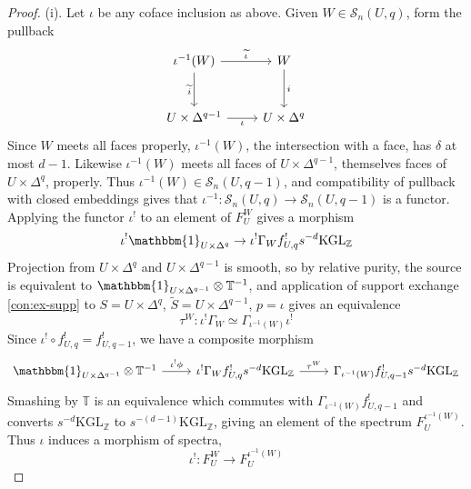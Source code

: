 \documentclass[11pt, twoside]{article}
\numberwithin{equation}{section}
\theoremstyle{definition}
\newcommand{\bb}[1]{\mathbb{#1}}
\newcommand{\Kgl}{\mathrm{KGL}}
\begin{document}
\begin{proof}
\item (i). Let \(\iota\) be any coface inclusion as above. Given \(W \in \mathcal{S}_n(U, q)\), form the pullback 
\begin{equation}\label{eq:face-square}
\begin{tikzcd} [row sep = large] \iota^{- 1}(W) \ar[d, "\tilde{i}", swap] \ar[r, "\tilde{\iota}"] & W \ar[d, "i"]\\
U \times \Delta^{q - 1} \ar[r, "\iota", swap] & U \times \Delta^q \end{tikzcd}
\end{equation}
Since \(W\) meets all faces properly, \(\iota^{- 1}(W)\), the intersection with a face, has \(\delta\) at most \(d - 1\). Likewise  \(\iota^{- 1}(W)\) meets all faces of \(U \times \Delta^{q - 1}\), themselves faces of \(U \times \Delta^q\), properly. Thus \(\iota^{- 1}(W) \in \mathcal{S}_n(U, q - 1)\), and compatibility of pullback with closed embeddings gives that \(\iota^{- 1} \colon \mathcal{S}_n(U, q) \to \mathcal{S}_n(U, q - 1)\) is a functor.  Applying the functor \(\iota^!\) to an element of \(F_U^W\) gives a morphism
\[\iota^!\mathbbm{1}_{U \times \Delta^q} \to \iota^!\Gamma_W f_{U, q}^! s^{- d} \Kgl_\bb{Z}\]
Projection from \(U \times \Delta^q\) and \(U \times \Delta^{q - 1}\) is smooth, so by relative purity, the source is equivalent to \(\mathbbm{1}_{U \times \Delta^{q - 1}} \otimes \bb{T}^{- 1}\), and application of support exchange \ref{con:ex-supp} to \(S = U \times \Delta^q\), \(\tilde{S} = U \times \Delta^{q - 1}\), \(p = \iota\) gives an equivalence
\[\tau^W \colon \iota^! \Gamma_W \simeq \Gamma_{\iota^{- 1}(W)}\iota^!\]
Since \(\iota^! \circ f_{U, q}^! = f_{U, q - 1}^!\), we have a composite morphism 
\[\begin{tikzcd} \mathbbm{1}_{U \times \Delta^{q - 1}} \otimes \bb{T}^{- 1} \ar[r, "\iota^! \phi"] & \iota^! \Gamma_W f_{U, q}^! s^{- d} \Kgl_\bb{Z} \ar[r, "\tau^W"] & \Gamma_{\iota^{- 1}(W)} f_{U, q - 1}^! s^{- d} \Kgl_\bb{Z} \end{tikzcd}\]
Smashing by \(\bb{T}\) is an equivalence which commutes with \(\Gamma_{\iota^{- 1}(W)} f_{U, q - 1}^!\) and converts \(s^{- d}\Kgl_\bb{Z}\) to \(s^{- (d - 1)} \Kgl_\bb{Z}\), giving an element of the spectrum \(F_U^{\iota^{- 1}(W)}\). Thus \(\iota\) induces a morphism of spectra, 
\[\iota^! \colon F_U^W \to F_U^{\iota^{- 1}(W)}\]


\end{proof}
\end{document}
